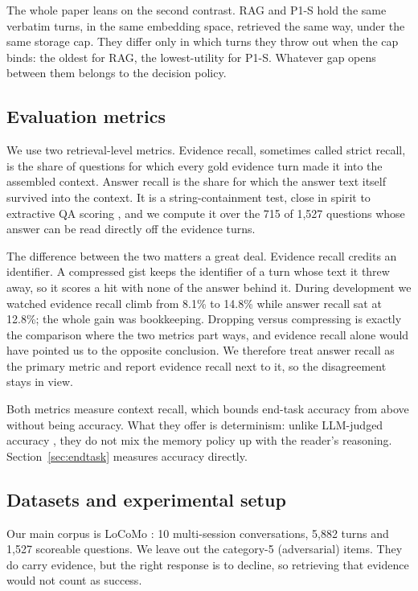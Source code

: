 The whole paper leans on the second contrast. RAG and P1-S hold the same
verbatim turns, in the same embedding space, retrieved the same way, under the
same storage cap. They differ only in which turns they throw out when the cap
binds: the oldest for RAG, the lowest-utility for P1-S. Whatever gap opens
between them belongs to the decision policy.

\subsection{Evaluation metrics}
\label{sec:metrics}

We use two retrieval-level metrics. Evidence recall, sometimes called strict
recall, is the share of questions for which every gold evidence turn made it
into the assembled context. Answer recall is the share for which the answer
text itself survived into the context. It is a string-containment test, close
in spirit to extractive QA scoring \cite{rajpurkar2016squad}, and we compute it
over the 715 of 1{,}527 questions whose answer can be read directly off the
evidence turns.

The difference between the two matters a great deal. Evidence recall credits
an identifier. A compressed gist keeps the identifier of a turn whose text it
threw away, so it scores a hit with none of the answer behind it. During
development we watched evidence recall climb from 8.1\% to 14.8\% while answer
recall sat at 12.8\%; the whole gain was bookkeeping. Dropping versus
compressing is exactly the comparison where the two metrics part ways, and
evidence recall alone would have pointed us to the opposite conclusion. We
therefore treat answer recall as the primary metric and report evidence recall
next to it, so the disagreement stays in view.

Both metrics measure context recall, which bounds end-task accuracy from above
without being accuracy. What they offer is determinism: unlike LLM-judged
accuracy \cite{zheng2023judge}, they do not mix the memory policy up with the
reader's reasoning. Section~\ref{sec:endtask} measures accuracy directly.

\subsection{Datasets and experimental setup}
\label{sec:setup}
Our main corpus is LoCoMo \cite{maharana2024locomo}: 10 multi-session
conversations, 5{,}882 turns and 1{,}527 scoreable questions. We leave out the
category-5 (adversarial) items. They do carry evidence, but the right response
is to decline, so retrieving that evidence would not count as success.

